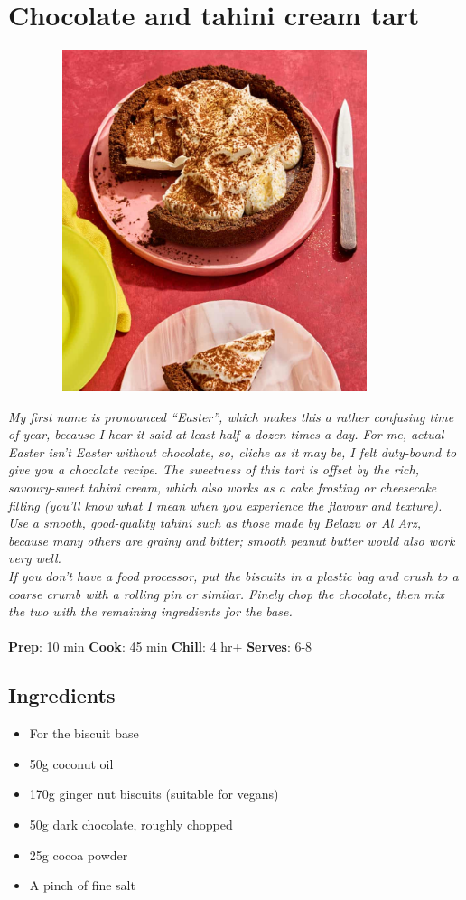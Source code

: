 \documentclass{book}
\begin{document}
\section{Chocolate and tahini cream tart}
\begin{figure}
\centering\includegraphics[width=10cm,height=10cm,keepaspectratio]{Recipe_Pictures/Chocolate_and_tahini_cream_tart.png}
\end{figure}
\emph{My first name is pronounced “Easter”, which makes this a rather confusing time of year, because I hear it said at least half a dozen times a day. For me, actual Easter isn’t Easter without chocolate, so, cliche as it may be, I felt duty-bound to give you a chocolate recipe. The sweetness of this tart is offset by the rich, savoury-sweet tahini cream, which also works as a cake frosting or cheesecake filling (you’ll know what I mean when you experience the flavour and texture). Use a smooth, good-quality tahini such as those made by Belazu or Al Arz, because many others are grainy and bitter; smooth peanut butter would also work very well.\\ 
If you don’t have a food processor, put the biscuits in a plastic bag and crush to a coarse crumb with a rolling pin or similar. Finely chop the chocolate, then mix the two with the remaining ingredients for the base.}\\\\ 
\textbf{Prep}: 10 min
\textbf{Cook}: 45 min
\textbf{Chill}: 4 hr+
\textbf{Serves}: 6-8
\subsection*{Ingredients}
\begin{itemize}
\item For the biscuit base
\item 50g coconut oil
\item 170g ginger nut biscuits (suitable for vegans)
\item 50g dark chocolate, roughly chopped
\item 25g cocoa powder
\item A pinch of fine salt
\end{itemize}
\end{document}
